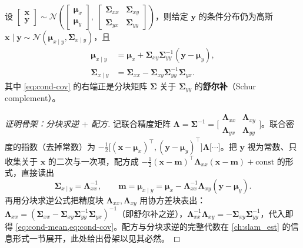 \begin{theorem}[联合高斯的条件分布]\label{thm:gauss-cond}
设 $\begin{bmatrix}\mathbf{x}\\\mathbf{y}\end{bmatrix}\sim\mathcal{N}\!\left(\begin{bmatrix}\boldsymbol{\mu}_x\\\boldsymbol{\mu}_y\end{bmatrix},\ \begin{bmatrix}\boldsymbol{\Sigma}_{xx}&\boldsymbol{\Sigma}_{xy}\\\boldsymbol{\Sigma}_{yx}&\boldsymbol{\Sigma}_{yy}\end{bmatrix}\right)$，则给定 $\mathbf{y}$ 的条件分布仍为高斯 $\mathbf{x}\mid\mathbf{y}\sim\mathcal{N}(\boldsymbol{\mu}_{x\mid y},\boldsymbol{\Sigma}_{x\mid y})$，且
\begin{align}
  \boldsymbol{\mu}_{x\mid y}&=\boldsymbol{\mu}_x+\boldsymbol{\Sigma}_{xy}\boldsymbol{\Sigma}_{yy}^{-1}(\mathbf{y}-\boldsymbol{\mu}_y),\label{eq:cond-mean}\\
  \boldsymbol{\Sigma}_{x\mid y}&=\boldsymbol{\Sigma}_{xx}-\boldsymbol{\Sigma}_{xy}\boldsymbol{\Sigma}_{yy}^{-1}\boldsymbol{\Sigma}_{yx}.\label{eq:cond-cov}
\end{align}
其中 \cref{eq:cond-cov} 的右端正是分块矩阵 $\boldsymbol{\Sigma}$ 关于 $\boldsymbol{\Sigma}_{yy}$ 的\textbf{舒尔补}（Schur complement）。
\end{theorem}
\begin{proof}[证明骨架：分块求逆 $+$ 配方]
记联合精度矩阵 $\boldsymbol{\Lambda}=\boldsymbol{\Sigma}^{-1}=\big[\begin{smallmatrix}\boldsymbol{\Lambda}_{xx}&\boldsymbol{\Lambda}_{xy}\\\boldsymbol{\Lambda}_{yx}&\boldsymbol{\Lambda}_{yy}\end{smallmatrix}\big]$。联合密度的指数（去掉常数）为 $-\tfrac12\big[(\mathbf{x}-\boldsymbol{\mu}_x)^\top,(\mathbf{y}-\boldsymbol{\mu}_y)^\top\big]\boldsymbol{\Lambda}\big[\cdots\big]$。把 $\mathbf{y}$ 视为常数、只收集关于 $\mathbf{x}$ 的二次与一次项，配方成 $-\tfrac12(\mathbf{x}-\mathbf{m})^\top\boldsymbol{\Lambda}_{xx}(\mathbf{x}-\mathbf{m})+\text{const}$ 的形式，直接读出
\[
  \boldsymbol{\Sigma}_{x\mid y}=\boldsymbol{\Lambda}_{xx}^{-1},\qquad
  \mathbf{m}=\boldsymbol{\mu}_{x\mid y}=\boldsymbol{\mu}_x-\boldsymbol{\Lambda}_{xx}^{-1}\boldsymbol{\Lambda}_{xy}(\mathbf{y}-\boldsymbol{\mu}_y).
\]
再用分块求逆公式把精度块 $\boldsymbol{\Lambda}_{xx},\boldsymbol{\Lambda}_{xy}$ 用协方差块表出：$\boldsymbol{\Lambda}_{xx}=(\boldsymbol{\Sigma}_{xx}-\boldsymbol{\Sigma}_{xy}\boldsymbol{\Sigma}_{yy}^{-1}\boldsymbol{\Sigma}_{yx})^{-1}$（即舒尔补之逆），$\boldsymbol{\Lambda}_{xx}^{-1}\boldsymbol{\Lambda}_{xy}=-\boldsymbol{\Sigma}_{xy}\boldsymbol{\Sigma}_{yy}^{-1}$，代入即得 \cref{eq:cond-mean,eq:cond-cov}。配方与分块求逆的完整代数在 \cref{ch:slam_est} 的信息形式一节展开，此处给出骨架以见其必然。
\end{proof}

